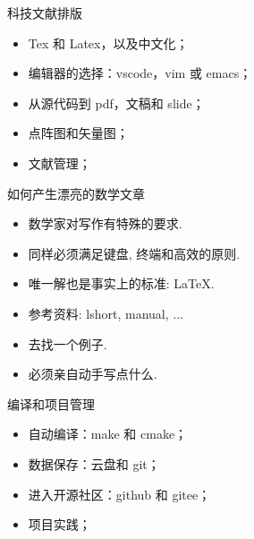 \documentclass{beamer}
\begin{document}
\begin{frame}{科技文献排版}
  \begin{itemize}
  \item<1-> Tex 和 Latex，以及中文化；
  \item<2-> 编辑器的选择：vscode，vim 或 emacs；
  \item<3-> 从源代码到 pdf，文稿和 slide；
  \item<4-> 点阵图和矢量图；
  \item<5-> 文献管理；
  \end{itemize}
\end{frame}

\begin{frame}{如何产生漂亮的数学文章}
  \begin{itemize}
  \item<1-> 数学家对写作有特殊的要求.
  \item<2-> 同样必须满足键盘, 终端和高效的原则.
  \item<3-> 唯一解也是事实上的标准: \LaTeX.
  \item<4-> 参考资料: lshort, manual, ...
  \item<5-> 去找一个例子.
  \item<6-> 必须亲自动手写点什么. 
  \end{itemize}
\end{frame}

\begin{frame}{编译和项目管理}
  \begin{itemize}
  \item<1-> 自动编译：make 和 cmake；
  \item<2-> 数据保存：云盘和 git；
  \item<3-> 进入开源社区：github 和 gitee；
  \item<4-> 项目实践；
  \end{itemize}
\end{frame}
\end{document}
